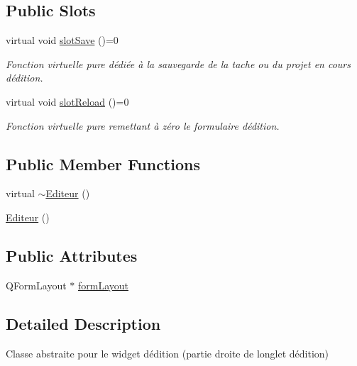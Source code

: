 \subsection*{Public Slots}
\begin{DoxyCompactItemize}
\item 
virtual void \hyperlink{class_editeur_a1a3347bf7dbaeceff75c3e680538cac0}{slot\+Save} ()=0
\begin{DoxyCompactList}\small\item\em Fonction virtuelle pure dédiée à la sauvegarde de la tache ou du projet en cours d\textquotesingle{}édition. \end{DoxyCompactList}\item 
virtual void \hyperlink{class_editeur_ae2aaafb952d6c5a30e8ee07c68089ea4}{slot\+Reload} ()=0
\begin{DoxyCompactList}\small\item\em Fonction virtuelle pure remettant à zéro le formulaire d\textquotesingle{}édition. \end{DoxyCompactList}\end{DoxyCompactItemize}
\subsection*{Public Member Functions}
\begin{DoxyCompactItemize}
\item 
virtual \hyperlink{class_editeur_abebd575d846e6216a3380d36a98667fe}{$\sim$\+Editeur} ()
\item 
\hyperlink{class_editeur_a9bcddfc63dada09233c785674c995221}{Editeur} ()
\end{DoxyCompactItemize}
\subsection*{Public Attributes}
\begin{DoxyCompactItemize}
\item 
Q\+Form\+Layout $\ast$ \hyperlink{class_editeur_ab1c926cc589df5011910a45480bf08f0}{form\+Layout}
\end{DoxyCompactItemize}


\subsection{Detailed Description}
Classe abstraite pour le widget d\textquotesingle{}édition (partie droite de l\textquotesingle{}onglet d\textquotesingle{}édition) 

